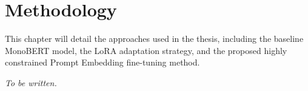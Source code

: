 \chapter{Methodology}
\label{ch:methodology}

This chapter will detail the approaches used in the thesis, including the baseline MonoBERT model, the LoRA adaptation strategy, and the proposed highly constrained Prompt Embedding fine-tuning method.

\textit{To be written.}
